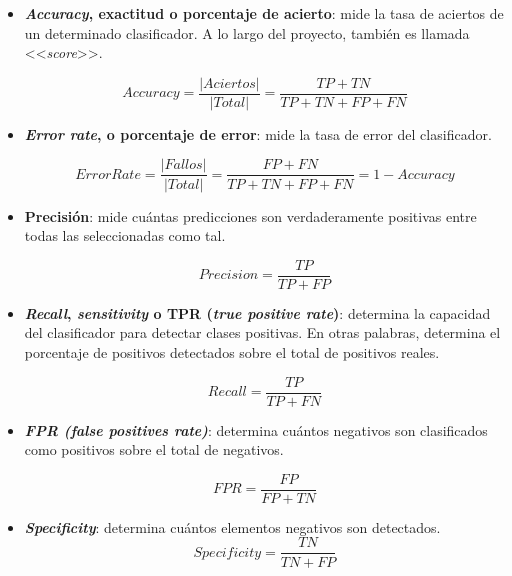 \begin{itemize}
	\item \textbf{\textit{Accuracy}, exactitud o porcentaje de acierto}: mide la tasa de aciertos de un determinado clasificador. A lo largo del proyecto, también es llamada <<\textit{score}>>.
	
	\begin{equation}\label{eqn:accuracy} Accuracy = \frac{|Aciertos|}{|Total|} = \frac{TP + TN}{TP + TN + FP + FN} \end{equation}
	
	\item \textbf{\textit{Error rate}, o porcentaje de error}: mide la tasa de error del clasificador.
	
	\begin{equation}\label{eqn:error} Error Rate = \frac{|Fallos|}{|Total|} = \frac{FP + FN}{TP + TN + FP + FN} = 1 - Accuracy \end{equation}
	
	\item \textbf{Precisión}: mide cuántas predicciones son verdaderamente positivas entre todas las seleccionadas como tal.
	
	\begin{equation}\label{eqn:precision} Precision = \frac{TP}{TP + FP}\end{equation} 
	
	\item \textbf{\textit{Recall}, \textit{sensitivity} o TPR (\textit{true positive rate})}: determina la capacidad del clasificador para detectar clases positivas. En otras palabras, determina el porcentaje de positivos detectados sobre el total de positivos reales.
	
	\begin{equation}\label{eqn:recall} Recall = \frac{TP}{TP + FN}\end{equation}
	
	\item \textbf{\textit{FPR (false positives rate)}}: determina cuántos negativos son clasificados como positivos sobre el total de negativos.
	
	\begin{equation}\label{eqn:FPR} FPR = \frac{FP}{FP + TN}\end{equation}
		
	\item \textbf{\textit{Specificity}}: determina cuántos elementos negativos son detectados.
	\begin{equation}\label{eqn:specificity} Specificity = \frac{TN}{TN + FP}\end{equation}
	

\end{itemize}
